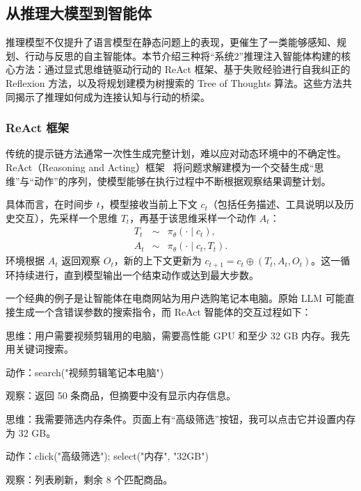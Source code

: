 \subsection{从推理大模型到智能体}

推理模型不仅提升了语言模型在静态问题上的表现，更催生了一类能够感知、规划、行动与反思的自主智能体。本节介绍三种将“系统2”推理注入智能体构建的核心方法：通过显式思维链驱动行动的 ReAct 框架、基于失败经验进行自我纠正的 Reflexion 方法，以及将规划建模为树搜索的 Tree of Thoughts 算法。这些方法共同揭示了推理如何成为连接认知与行动的桥梁。

\subsubsection{ReAct 框架}

传统的提示链方法通常一次性生成完整计划，难以应对动态环境中的不确定性。ReAct（Reasoning and Acting）框架~\cite{yao-etal:2023react} 将问题求解建模为一个交替生成“思维”与“动作”的序列，使模型能够在执行过程中不断根据观察结果调整计划。

具体而言，在时间步 $t$，模型接收当前上下文 $c_t$（包括任务描述、工具说明以及历史交互），先采样一个思维 $T_t$，再基于该思维采样一个动作 $A_t$：
\begin{eqnarray}
T_t &\sim& \pi_\theta(\cdot \mid c_t), \\
A_t &\sim& \pi_\theta(\cdot \mid c_t, T_t).
\end{eqnarray}
环境根据 $A_t$ 返回观察 $O_t$，新的上下文更新为 $c_{t+1} = c_t \oplus (T_t, A_t, O_t)$。这一循环持续进行，直到模型输出一个结束动作或达到最大步数。

一个经典的例子是让智能体在电商网站为用户选购笔记本电脑。原始 LLM 可能直接生成一个含错误参数的搜索指令，而 ReAct 智能体的交互过程如下：

\vspace{0.5em}

\begin{tcolorbox}

\begingroup

思维：用户需要视频剪辑用的电脑，需要高性能 GPU 和至少 32 GB 内存。我先用关键词搜索。

动作：search("视频剪辑笔记本电脑")

观察：返回 50 条商品，但摘要中没有显示内存信息。

思维：我需要筛选内存条件。页面上有“高级筛选”按钮，我可以点击它并设置内存为 32 GB。

动作：click("高级筛选"); select("内存", "32GB")

观察：列表刷新，剩余 8 个匹配商品。

\endgroup

\end{tcolorbox}

